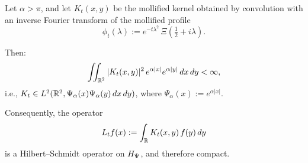 \begin{lemma}
\label{lem:kernel_L2_weighted_bound}
Let \( \alpha > \pi \), and let \( K_t(x,y) \) be the mollified kernel obtained by convolution with an inverse Fourier transform of the mollified profile
\[
\phi_t(\lambda) := e^{-t\lambda^2} \, \Xi\left( \tfrac{1}{2} + i\lambda \right).
\]

Then:
\[
\iint_{\mathbb{R}^2} |K_t(x,y)|^2 \, e^{\alpha|x|} e^{\alpha|y|} \, dx \, dy < \infty,
\]
i.e., \( K_t \in L^2(\mathbb{R}^2, \Psi_\alpha(x)\Psi_\alpha(y)\, dx\, dy) \), where \( \Psi_\alpha(x) := e^{\alpha |x|} \).

\medskip
\noindent Consequently, the operator
\[
L_t f(x) := \int_{\mathbb{R}} K_t(x,y)\, f(y)\, dy
\]
is a Hilbert--Schmidt operator on \( H_{\Psi} \), and therefore compact.
\end{lemma}
